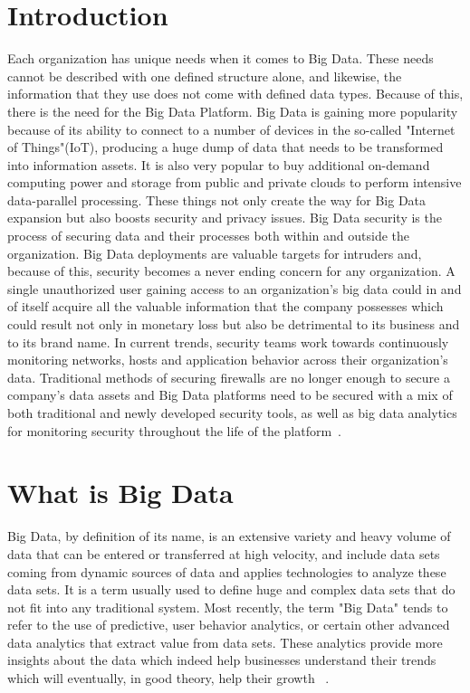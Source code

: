 \section{Introduction}
Each organization has unique needs when it comes to Big Data.  
These needs cannot be described with one defined structure alone,
and likewise, the information that they use does not come with 
defined data types.  Because of this, there is the need for the
Big Data Platform. Big Data is gaining more popularity because 
of its ability to connect to a number of devices in the so-called
"Internet of Things"(IoT),  producing a huge dump of data that 
needs to be transformed into information assets. It is also very 
popular to buy additional on-demand computing power and storage
from public and private clouds to perform intensive data-parallel
processing. These things not only create the way for Big Data
expansion but also boosts security and privacy issues. Big Data
security is the process of securing data and their processes 
both within and outside the organization. Big Data deployments
are valuable targets for intruders and, because of this, security
becomes a never ending concern for any organization. A single
unauthorized user gaining access to an  organization's big data
could in and of itself acquire all the valuable information 
that the company possesses which could result not only in monetary
loss but also be detrimental to its business and to its brand name.
In current trends, security teams work towards continuously 
monitoring networks, hosts and application behavior across their
organization's data. Traditional methods of securing firewalls 
are no longer enough to secure a company's data assets and Big 
Data platforms need to be secured with a mix of both traditional
and newly developed security tools, as well as big data analytics
for monitoring security throughout the life of the 
platform~\cite{moura2016}.

\section{What is Big Data}
Big Data, by definition of its name, is an extensive variety and
heavy volume of data that can be entered or transferred at high
velocity, and include data sets coming from dynamic sources of
data and applies technologies to analyze these data sets. It is
a term usually used to define huge and complex data sets that do
not fit into any traditional system. Most recently, the term
"Big Data" tends to refer to the use of predictive, user behavior
analytics, or certain other advanced data analytics that extract 
value from data sets. These analytics provide more insights about
the data which indeed help businesses understand their trends
which will eventually, in good theory, help their growth
~\cite{hey2009fourth}.

